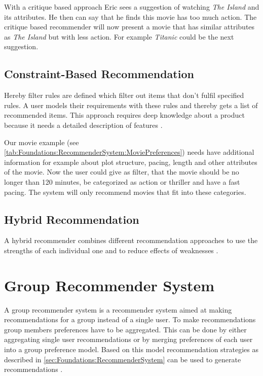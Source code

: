 With a critique based approach Eric sees a suggestion of watching \textit{The Island} and its attributes. He then can say that he finds this movie has too much action. The critique based recommender will now present a movie that has similar attributes as \textit{The Island} but with less action. For example \textit{Titanic} could be the next suggestion.

\subsection{Constraint-Based Recommendation}
Hereby filter rules are defined which filter out items that don't fulfil specified rules. A user models their requirements with these rules and thereby gets a list of recommended items. This approach requires deep knowledge about a product because it needs a detailed description of features  \cite[~ p. 12]{felfernigDecisionTasksBasic2018}.

Our movie example (see \autoref{tab:Foundations:RecommenderSystem:MoviePreferences}) needs have additional information for example about plot structure, pacing, length and other attributes of the movie. Now the user could give as filter, that the movie should be no longer than 120 minutes, be categorized as action or thriller and have a fast pacing. The system will only recommend movies that fit into these categories.

\subsection{Hybrid Recommendation}
A hybrid recommender combines different recommendation approaches to use the strengths of each individual one and to reduce effects of weaknesses \cite{burkeHybridRecommenderSystems2002}.

\section{Group Recommender System}

A group recommender system is a recommender system aimed at making recommendations for a group instead of a single user. To make recommendations group members preferences have to be aggregated. This can be done by either aggregating single user recommendations or by merging preferences of each user into a group preference model. Based on this model recommendation strategies as described in \autoref{sec:Foundations:RecommenderSystem} can be used to generate recommendations \cite{jamesonRecommendationGroups2007}.

